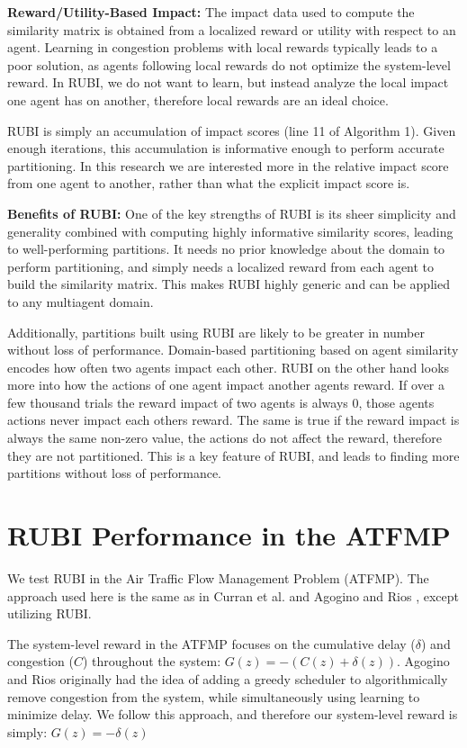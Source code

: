 \documentclass{aamas_extabstract}
\begin{document}
\textbf{Reward/Utility-Based Impact:} The impact data used to compute the similarity matrix is obtained from a localized reward or utility with respect to an agent. Learning in congestion problems with local rewards typically leads to a poor solution, as agents following local rewards do not optimize the system-level reward. In RUBI, we do not want to learn, but instead analyze the local impact one agent has on another, therefore local rewards are an ideal choice.

RUBI is simply an accumulation of impact scores (line 11 of Algorithm 1). Given enough iterations, this accumulation is informative enough to perform accurate partitioning. In this research we are interested more in the relative impact score from one agent to another, rather than what the explicit impact score is. 

\textbf{Benefits of RUBI:} One of the key strengths of RUBI is its sheer simplicity and generality combined with computing highly informative similarity scores, leading to well-performing partitions. It needs no prior knowledge about the domain to perform partitioning, and simply needs a localized reward from each agent to build the similarity matrix. This makes RUBI highly generic and can be applied to any multiagent domain. 

Additionally, partitions built using RUBI are likely to be greater in number without loss of performance. Domain-based partitioning based on agent similarity encodes how often two agents impact each other. RUBI on the other hand looks more into how the actions of one agent impact another agents reward. If over a few thousand trials the reward impact of two agents is always 0, those agents actions never impact each others reward. The same is true if the reward impact is always the same non-zero value, the actions do not affect the reward, therefore they are not partitioned. This is a key feature of RUBI, and leads to finding more partitions without loss of performance.

\section{RUBI Performance in the ATFMP}
We test RUBI in the Air Traffic Flow Management Problem (ATFMP). The approach used here is the same as in Curran et al. \cite{Curran:2013:AHC:2484920.2485183} and Agogino and Rios \cite{Agogino:2009:EEM:1570256.1570258,Rios}, except utilizing RUBI.

The system-level reward in the ATFMP focuses on the cumulative delay ($\delta$) and congestion ($C$) throughout the system: $G(z) = -(C(z) + \delta(z))$. Agogino and Rios originally had the idea of adding a greedy scheduler to algorithmically remove congestion from the system, while simultaneously using learning to minimize delay. We follow this approach, and therefore our system-level reward is simply: $G(z) = -\delta(z)$
\end{document}
